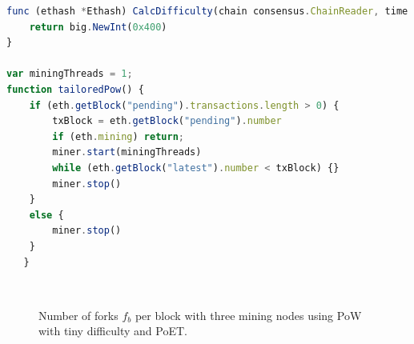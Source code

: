 \begin{lstlisting}[language=JavaScript]
func (ethash *Ethash) CalcDifficulty(chain consensus.ChainReader, time uint64, parent *types.Header) *big.Int {
    return big.NewInt(0x400)
}

var miningThreads = 1;
function tailoredPow() {
    if (eth.getBlock("pending").transactions.length > 0) {
        txBlock = eth.getBlock("pending").number
        if (eth.mining) return;
        miner.start(miningThreads)
        while (eth.getBlock("latest").number < txBlock) {}
        miner.stop()
    }
    else {
        miner.stop()
    }
   }
\end{lstlisting}

\begin{figure}[bth]
	\myfloatalign
	 \quad
	 \\
	\caption{Number of forks $f_b$ per block with three mining nodes using PoW with tiny difficulty and PoET.}
	\label{fig:forks}
\end{figure}

